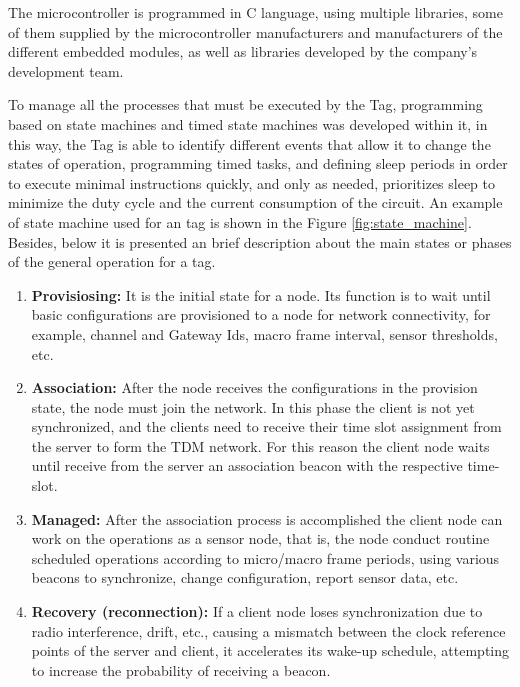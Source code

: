 \documentclass[journal]{IEEEtran}	%
\begin{document}
The microcontroller is programmed in C language, using multiple libraries, some of them supplied by the microcontroller manufacturers and manufacturers of the different embedded modules, as well as libraries developed by the company's development team. 

To manage all the processes that must be executed by the Tag, programming based on state machines and timed state machines was developed within it, in this way, the Tag is able to identify different events that allow it to change the states of operation, programming timed tasks, and defining sleep periods in order to execute minimal instructions quickly, and only as needed, prioritizes sleep to minimize the duty cycle and the current consumption of the circuit. An example of state machine used for an tag is shown in the Figure \ref{fig:state_machine}.\\

Besides, below it is presented an brief description about the main states or phases of the general operation for a tag.

\begin{enumerate}
\item \textbf{Provisiosing:} It is the initial state for a node. Its function is to wait until basic configurations are provisioned to a node for network connectivity, for example, channel and Gateway Ids, macro frame interval, sensor thresholds, etc.
\item \textbf{Association:} After the node receives the configurations in the provision state, the node must join the network. In this phase the client is not yet synchronized, and the clients need to receive their time slot assignment from the server to form the TDM network. For this reason the client node waits until receive from the server an association beacon with the respective time-slot.
\item \textbf{Managed:} After the association process is accomplished the client node can work on the operations as a sensor node, that is, the node conduct routine scheduled operations according to micro/macro frame periods, using various beacons to synchronize, change configuration, report sensor data, etc.
\item \textbf{Recovery (reconnection):} If a client node loses synchronization due to radio interference, drift, etc., causing a mismatch between the clock reference points of the server and client, it accelerates its wake-up schedule, attempting to increase the probability of receiving a beacon. 
\end{enumerate}
\end{document}
